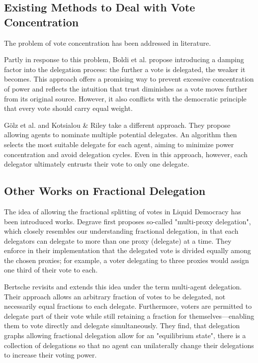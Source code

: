 \subsection{Existing Methods to Deal with Vote Concentration}

The problem of vote concentration has been addressed in literature. 

Partly in response to this problem, Boldi et al. propose introducing a damping factor into the delegation process: the further a vote is delegated, the weaker it becomes. \cite{boldiViscousDemocracySocial2011} This approach offers a promising way to prevent excessive concentration of power and reflects the intuition that trust diminishes as a vote moves further from its original source. However, it also conflicts with the democratic principle that every vote should carry equal weight. 

Gölz et al. and Kotsialou \& Riley take a different approach. They propose allowing agents to nominate multiple potential delegates. An algorithm then selects the most suitable delegate for each agent, aiming to minimize power concentration and avoid delegation cycles. \cite{kotsialouIncentivisingParticipationLiquid2019, golzFluidMechanicsLiquid2021} Even in this approach, however, each delegator ultimately entrusts their vote to only one delegate.

\subsection{Other Works on Fractional Delegation}

The idea of allowing the fractional splitting of votes in Liquid Democracy has been introduced works. Degrave first proposes so-called "multi-proxy delegation", which closely resembles our understanding fractional delegation, in that each delegators can delegate to more than one proxy (delegate) at a time. \cite{degraveResolvingMultiproxyTransitive2014} 
They enforce in their implementation that the delegated vote is divided equally among the chosen proxies; for example, a voter delegating to three proxies would assign one third of their vote to each.

Bertsche revisits and extends this idea under the term multi-agent delegation.  \cite{bersetcheGeneralizingLiquidDemocracy2022} Their approach allows an arbitrary fraction of votes to be delegated, not necessarily equal fractions to each delegate. Furthermore, voters are permitted to delegate part of their vote while still retaining a fraction for themselves—enabling them to vote directly and delegate simultaneously. They find, that delegation graphs allowing fractional delegation allow for an "equilibrium state", there is a collection of delegations so that no agent can unilaterally change their delegations to increase their voting power.
